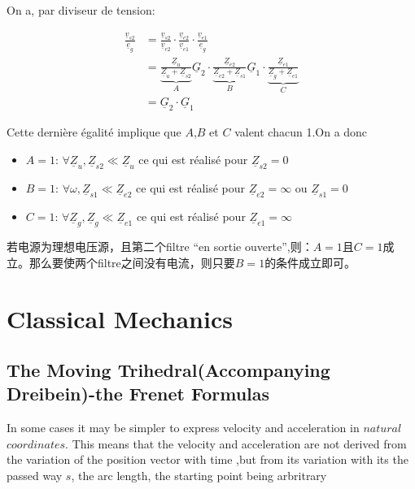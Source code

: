 \documentclass[12pt]{book}
\theoremstyle{definition}\newtheorem{dfn}{Définition}[chapter]
\theoremstyle{plain}\newtheorem{thm}{Théorème}[chapter]
\theoremstyle{plain}\newtheorem{prp}{Proposition}[chapter]
\theoremstyle{plain}\newtheorem{lem}{\bf Lemme}[chapter]
\theoremstyle{plain}\newtheorem{axm}{\bf Axiome}[chapter]
\theoremstyle{plain}\newtheorem{lmm}{\bf Lemme}[chapter]
\theoremstyle{plain}\newtheorem{cor}{\bf Corollaire}[chapter]
\theoremstyle{remark}\newtheorem{rem}{Remarque}[chapter]
\begin{document}
On a, par diviseur de tension:
\begin{framed}
$$
\begin{aligned}
\frac{\underline{v}_{s2}}{\underline{e}_g}&=\frac{\underline{v}_{s2}}{\underline{v}_{e2}}\cdot\frac{\underline{v}_{e2}}{\underline{v}_{e1}}\cdot\frac{\underline{v}_{e1}}{\underline{e}_g}\\
&=\underbrace{\frac{\underline{Z}_u}{\underline{Z}_u+\underline{Z}_{s2}}}_{A}\underline{G}_2\cdot\underbrace{\frac{\underline{Z}_{e2}}{\underline{Z}_{e2}+\underline{Z}_{s1}}}_{B}\underline{G}_1\cdot\underbrace{\frac{\underline{Z}_{e1}}{\underline{Z}_g+\underline{Z}_{e1}}}_{C}\\
&=\underline{G}_2\cdot\underline{G}_1
\end{aligned}
$$
\end{framed}
Cette dernière égalité implique que $A$,$B$ et $C$ valent chacun 1.On a donc 
\begin{framed}
\begin{itemize}
	\item $A=1$: $\forall \underline{Z}_u,  \underline{Z}_{s2}\ll \underline{Z}_u$ ce qui est réalisé pour $\underline{Z}_{s2}=0$
	\item $B=1$: $\forall \omega, \underline{Z}_{s1}\ll \underline{Z}_{e2}$ ce qui est réalisé pour $\underline{Z}_{e2}=\infty$ ou $\underline{Z}_{s1}=0$
	\item $C=1$: $\forall \underline{Z}_g,  \underline{Z}_{g}\ll \underline{Z}_{e1}$ ce qui est réalisé pour $\underline{Z}_{e1}=\infty$
\end{itemize}
\end{framed}
若电源为理想电压源，且第二个filtre “en sortie ouverte”,则：$A=1$且$C=1$成立。那么要使两个filtre之间没有电流，则只要$B=1$的条件成立即可。











\chapter{Classical Mechanics}
\section{The Moving Trihedral(Accompanying Dreibein)-the Frenet Formulas}

In some cases it may be simpler to express velocity and acceleration in $\mathit{natural}$ $\mathit{coordinates}$.
This means that the velocity and acceleration are not derived from the variation of the position vector with time ,but from its variation with its the  passed way $s$, the arc length, the starting point being arbritrary 
\end{document}
